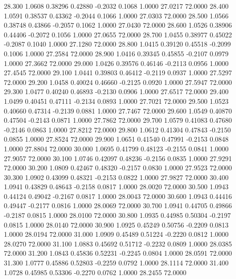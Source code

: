   28.300   1.0608   0.38296   0.42880  -0.2032   0.1068   1.0000  27.0217  72.0000
  28.400   1.0591   0.38537   0.43362  -0.2044   0.1066   1.0000  27.0303  72.0000
  28.500   1.0566   0.38748   0.43866  -0.2057   0.1062   1.0000  27.0430  72.0000
  28.600   1.0526   0.38906   0.44406  -0.2072   0.1056   1.0000  27.0655  72.0000
  28.700   1.0455   0.38977   0.45022  -0.2087   0.1040   1.0000  27.1280  72.0000
  28.800   1.0415   0.39120   0.45518  -0.2099   0.1006   1.0000  27.2584  72.0000
  28.900   1.0416   0.39345   0.45855  -0.2107   0.0979   1.0000  27.3662  72.0000
  29.000   1.0426   0.39576   0.46146  -0.2113   0.0956   1.0000  27.4545  72.0000
  29.100   1.0441   0.39803   0.46412  -0.2119   0.0937   1.0000  27.5297  72.0000
  29.200   1.0458   0.40024   0.46660  -0.2125   0.0920   1.0000  27.5947  72.0000
  29.300   1.0477   0.40240   0.46893  -0.2130   0.0906   1.0000  27.6517  72.0000
  29.400   1.0499   0.40451   0.47111  -0.2134   0.0893   1.0000  27.7021  72.0000
  29.500   1.0523   0.40660   0.47314  -0.2139   0.0881   1.0000  27.7467  72.0000
  29.600   1.0549   0.40870   0.47504  -0.2143   0.0871   1.0000  27.7862  72.0000
  29.700   1.0579   0.41083   0.47680  -0.2146   0.0863   1.0000  27.8212  72.0000
  29.800   1.0612   0.41304   0.47843  -0.2150   0.0855   1.0000  27.8524  72.0000
  29.900   1.0651   0.41540   0.47991  -0.2153   0.0848   1.0000  27.8804  72.0000
  30.000   1.0695   0.41799   0.48123  -0.2155   0.0841   1.0000  27.9057  72.0000
  30.100   1.0746   0.42097   0.48236  -0.2156   0.0835   1.0000  27.9291  72.0000
  30.200   1.0809   0.42467   0.48320  -0.2157   0.0830   1.0000  27.9523  72.0000
  30.300   1.0902   0.43099   0.48321  -0.2153   0.0822   1.0000  27.9827  72.0000
  30.400   1.0941   0.43829   0.48643  -0.2158   0.0817   1.0000  28.0020  72.0000
  30.500   1.0943   0.44124   0.49042  -0.2167   0.0817   1.0000  28.0043  72.0000
  30.600   1.0943   0.44416   0.49447  -0.2177   0.0816   1.0000  28.0069  72.0000
  30.700   1.0941   0.44705   0.49866  -0.2187   0.0815   1.0000  28.0100  72.0000
  30.800   1.0935   0.44985   0.50304  -0.2197   0.0815   1.0000  28.0140  72.0000
  30.900   1.0925   0.45249   0.50756  -0.2209   0.0813   1.0000  28.0194  72.0000
  31.000   1.0909   0.45489   0.51224  -0.2220   0.0812   1.0000  28.0270  72.0000
  31.100   1.0883   0.45692   0.51712  -0.2232   0.0809   1.0000  28.0385  72.0000
  31.200   1.0843   0.45836   0.52231  -0.2245   0.0804   1.0000  28.0591  72.0000
  31.300   1.0777   0.45886   0.52803  -0.2259   0.0792   1.0000  28.1114  72.0000
  31.400   1.0728   0.45985   0.53306  -0.2270   0.0762   1.0000  28.2455  72.0000
